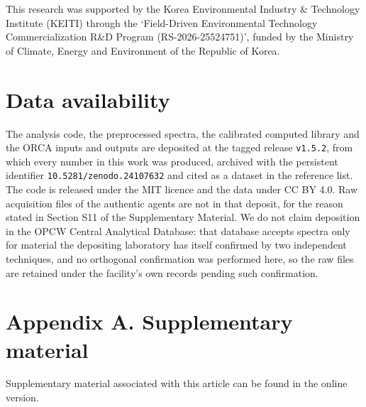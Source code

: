 \documentclass[review,12pt]{elsarticle}
\begin{document}
\begin{sloppypar}
This research was supported by the Korea Environmental Industry \& Technology Institute
(KEITI) through the `Field-Driven Environmental Technology Commercialization R\&D
Program (RS-2026-25524751)', funded by the Ministry of Climate, Energy and Environment
of the Republic of Korea.
\end{sloppypar}

\section*{Data availability}

The analysis code, the preprocessed spectra, the calibrated computed library and the
ORCA inputs and outputs are deposited at the tagged release \texttt{v1.5.2}, from which
every number in this work was produced, archived with the persistent identifier
\texttt{10.5281/zenodo.24107632} and cited as a dataset in the reference
list.\cite{ramanforge2026deposit} The code is released under the MIT licence and the data
under CC BY 4.0. Raw
acquisition files of the authentic agents are not in that deposit, for the reason stated in
Section S11 of the Supplementary Material. We do not claim deposition in the OPCW Central
Analytical Database: that database accepts spectra only for material the depositing
laboratory has itself confirmed by two independent techniques, and no orthogonal
confirmation was performed here, so the raw files are retained under the facility's own
records pending such confirmation.

\section*{Appendix A. Supplementary material}

Supplementary material associated with this article can be found in the online version.



\end{document}
